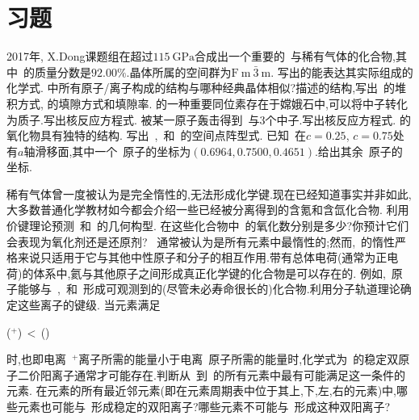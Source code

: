 \documentclass{ctexbook}
\begin{document}
\section*{习题}
\begin{problem}{}
    \subproblem 2017年, X.Dong课题组在超过$\SI{115}{\giga\pascal}$合成出一个重要的~与稀有气体的化合物,其中~的质量分数是$92.00\%$.晶体所属的空间群为$\text{F}\ \text{m}\ \bar{3}\ \text{m}$.
    \subsubproblem 写出的能表达其实际组成的化学式.
    \subsubproblem {}中所有原子/离子构成的结构与哪种经典晶体相似?描述的结构,写出~的堆积方式, 的填隙方式和填隙率.
    \subsubproblem {}的一种重要同位素存在于嫦娥石中,可以将中子转化为质子.写出核反应方程式.
    \subproblem {}被某一原子轰击得到~与3个中子.写出核反应方程式.
    \subproblem {}的氧化物具有独特的结构.
    \subsubproblem 写出~,~和~的空间点阵型式.
    \subsubproblem 已知~在$c=0.25$, $c=0.75$处有$a$轴滑移面,其中一个~原子的坐标为$(0.6964,0.7500,0.4651)$.给出其余~原子的坐标.
\end{problem}
\begin{problem}{}
    稀有气体曾一度被认为是完全惰性的,无法形成化学键.现在已经知道事实并非如此,大多数普通化学教材如今都会介绍一些已经被分离得到的含氪和含氙化合物.
    \subsubproblem 利用价键理论预测~和~的几何构型.
    \subsubproblem 在这些化合物中~的氧化数分别是多少?你预计它们会表现为氧化剂还是还原剂?
    \subproblem ~通常被认为是所有元素中最惰性的;然而,~的惰性严格来说只适用于它与其他中性原子和分子的相互作用.带有总体电荷(通常为正电荷)的体系中,氦与其他原子之间形成真正化学键的化合物是可以存在的.
    \subsubproblem 例如,~原子能够与~,~和~形成可观测到的(尽管未必寿命很长的)化合物.利用分子轨道理论确定这些离子的键级.
    \subsubproblem 当元素满足
    \begin{tightcenter}
        ($^+$)\,$<$\,()
    \end{tightcenter}
    时,也即电离~$^+$离子所需的能量小于电离~原子所需的能量时,化学式为~的稳定双原子二价阳离子通常才可能存在.判断从~到~的所有元素中最有可能满足这一条件的元素.
    \subsubproblem 在元素的所有最近邻元素(即在元素周期表中位于其上,下,左,右的元素)中,哪些元素也可能与~形成稳定的双阳离子?哪些元素不可能与~形成这种双阳离子?
\end{problem}
\end{document}
